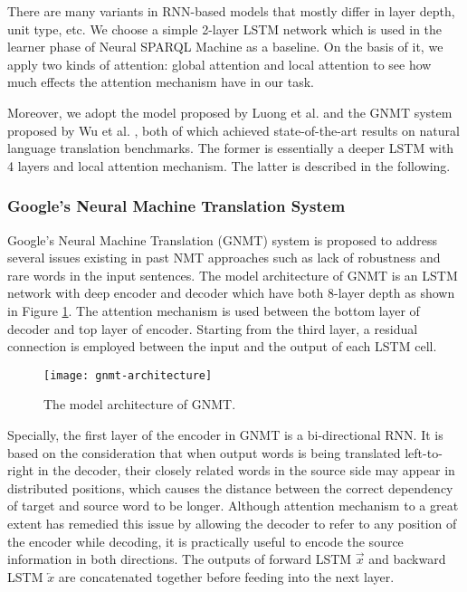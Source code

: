 There are many variants in RNN-based models that mostly differ in layer depth, unit type, etc. We choose a simple 2-layer LSTM network which is used in the learner phase of Neural SPARQL Machine \cite{Soru2018a} as a baseline. On the basis of it, we apply two kinds of attention: global attention \cite{Bahdanau2014} and local attention \cite{Luong2015} to see how much effects the attention mechanism have in our task.

Moreover, we adopt the model proposed by Luong et al. \cite{Luong2015} and the GNMT system proposed by Wu et al. \cite{Wu2016}, both of which achieved state-of-the-art results on natural language translation benchmarks. The former is essentially a deeper LSTM with 4 layers and local attention mechanism. The latter is described in the following.

\subsubsection*{Google's Neural Machine Translation System}

Google's Neural Machine Translation (GNMT) system \cite{Wu2016} is proposed to address several issues existing in past NMT approaches such as lack of robustness and rare words in the input sentences. The model architecture of GNMT is an LSTM network with deep encoder and decoder which have both 8-layer depth as shown in Figure \ref{figure:gnmt architecture}. The attention mechanism is used between the bottom layer of decoder and top layer of encoder. Starting from the third layer, a residual connection is employed between the input and the output of each LSTM cell.

\begin{figure}[h]
\texttt{[image: gnmt-architecture]}
\centering
\caption{The model architecture of GNMT.}
\label{figure:gnmt architecture}
\end{figure}

Specially, the first layer of the encoder in GNMT is a bi-directional RNN. It is based on the consideration that when output words is being translated left-to-right in the decoder, their closely related words in the source side may appear in distributed positions, which causes the distance between the correct dependency of target and source word to be longer. Although attention mechanism to a great extent has remedied this issue by allowing the decoder to refer to any position of the encoder while decoding, it is practically useful to encode the source information in both directions. The outputs of forward LSTM $ \overrightarrow{x} $ and backward LSTM $ \overleftarrow{x} $ are concatenated together before feeding into the next layer.

